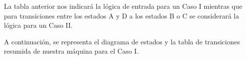 La tabla anterior nos indicará la lógica de entrada para un Caso I mientras que para transiciones entre los estados A y D a los estados B o C se considerará la lógica para un Caso II.


A continuación, se representa el diagrama de estados y la tabla de transiciones resumida de nuestra máquina para el Caso I.
 

\begin{table}[H]
\begin{center}
\label{Tabla_de_transiciones_Ej1}
\caption{Tabla de transiciones}
\end{center}
\end{table}

